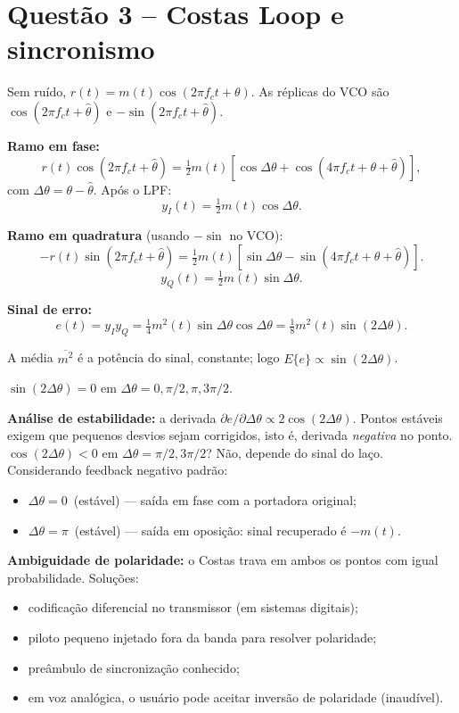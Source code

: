 \documentclass[11pt,a4paper]{article}
\begin{document}
\section*{Questão 3 -- Costas Loop e sincronismo}

\begin{resolucao}

Sem ruído, $r(t) = m(t)\cos(2\pi f_c t + \theta)$. As réplicas do VCO são $\cos(2\pi f_c t + \hat\theta)$ e $-\sin(2\pi f_c t + \hat\theta)$.

\textbf{Ramo em fase:}
\[
  r(t)\cos(2\pi f_c t + \hat\theta) = \tfrac{1}{2}m(t)[\cos\Delta\theta + \cos(4\pi f_c t + \theta + \hat\theta)],
\]
com $\Delta\theta = \theta - \hat\theta$. Após o LPF:
\[
  \boxed{y_I(t) = \tfrac{1}{2}m(t)\cos\Delta\theta.}
\]

\textbf{Ramo em quadratura} (usando $-\sin$ no VCO):
\[
  -r(t)\sin(2\pi f_c t + \hat\theta) = \tfrac{1}{2}m(t)[\sin\Delta\theta - \sin(4\pi f_c t + \theta + \hat\theta)].
\]
\[
  \boxed{y_Q(t) = \tfrac{1}{2}m(t)\sin\Delta\theta.}
\]

\textbf{Sinal de erro:}
\[
  e(t) = y_I y_Q = \tfrac{1}{4}m^2(t)\sin\Delta\theta\cos\Delta\theta = \tfrac{1}{8}m^2(t)\sin(2\Delta\theta).
\]

A média $\overline{m^2}$ é a potência do sinal, constante; logo $E\{e\} \propto \sin(2\Delta\theta)$.
\end{resolucao}

\begin{resolucao}

$\sin(2\Delta\theta) = 0$ em $\Delta\theta = 0, \pi/2, \pi, 3\pi/2$.

\textbf{Análise de estabilidade:} a derivada $\partial e/\partial\Delta\theta \propto 2\cos(2\Delta\theta)$. Pontos estáveis exigem que pequenos desvios sejam corrigidos, isto é, derivada \emph{negativa} no ponto. $\cos(2\Delta\theta) < 0$ em $\Delta\theta = \pi/2, 3\pi/2$? Não, depende do sinal do laço. Considerando feedback negativo padrão:
\begin{itemize}\itemsep0pt
  \item $\Delta\theta = 0$ \,(estável) — saída em fase com a portadora original;
  \item $\Delta\theta = \pi$ \,(estável) — saída em oposição: sinal recuperado é $-m(t)$.
\end{itemize}

\textbf{Ambiguidade de polaridade:} o Costas trava em ambos os pontos com igual probabilidade. Soluções:
\begin{itemize}\itemsep0pt
  \item codificação diferencial no transmissor (em sistemas digitais);
  \item piloto pequeno injetado fora da banda para resolver polaridade;
  \item preâmbulo de sincronização conhecido;
  \item em voz analógica, o usuário pode aceitar inversão de polaridade (inaudível).
\end{itemize}
\end{resolucao}
\end{document}
